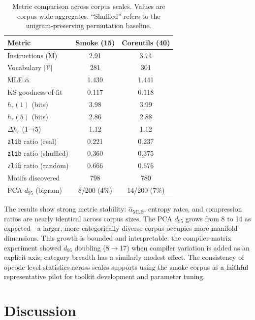 \documentclass[10pt,twocolumn]{article}
\newcommand{\zlib}{\texttt{zlib}}
\begin{document}
\begin{table}[h]
\centering
\caption{Metric comparison across corpus scales.  Values are corpus-wide
  aggregates.  ``Shuffled'' refers to the unigram-preserving permutation
  baseline.}
\label{tab:scaling}
\small
\begin{tabular}{@{}lcc@{}}
\toprule
\textbf{Metric} & \textbf{Smoke (15)} & \textbf{Coreutils (40)} \\
\midrule
Instructions (M)         & 2.91  & 3.74  \\
Vocabulary $|\mathcal{V}|$   & 281   & 301   \\
MLE $\hat{\alpha}$       & 1.439 & 1.441 \\
KS goodness-of-fit       & 0.117 & 0.118 \\
$h_r(1)$ (bits)          & 3.98  & 3.99  \\
$h_r(5)$ (bits)          & 2.86  & 2.88  \\
$\Delta h_r$ (1→5)       & 1.12  & 1.12  \\
\zlib{} ratio (real)     & 0.221 & 0.237 \\
\zlib{} ratio (shuffled) & 0.360 & 0.375 \\
\zlib{} ratio (random)   & 0.666 & 0.676 \\
Motifs discovered        & 798   & 780   \\
PCA $d_{95}$ (bigram)    & 8/200 (4\%) & 14/200 (7\%) \\
\bottomrule
\end{tabular}
\end{table}

The results show strong metric stability: $\hat{\alpha}_{\text{MLE}}$,
entropy rates, and compression ratios are nearly identical across corpus
sizes.  The PCA $d_{95}$ grows from 8 to 14 as expected---a larger, more
categorically diverse corpus occupies more manifold dimensions.  This
growth is bounded and interpretable: the compiler-matrix experiment showed
$d_{95}$ doubling (8$\to$17) when compiler variation is added as an
explicit axis; category breadth has a similarly modest effect.
The consistency of opcode-level statistics across scales supports using
the smoke corpus as a faithful representative pilot for toolkit development
and parameter tuning.

\section{Discussion}
\label{sec:discussion}
\end{document}
